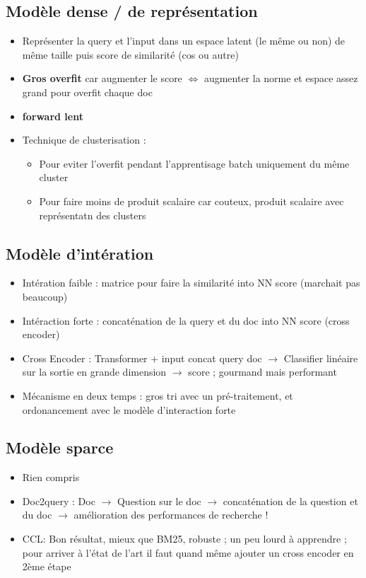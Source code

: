 \documentclass{article}
\theoremstyle{plain}%
\theoremstyle{definition}
\theoremstyle{remark}
\begin{document}
\subsection{Modèle dense / de représentation}
\begin{itemize}
    \item Représenter la query et l'input dans un espace latent (le même ou non) de même taille puis score de similarité (cos ou autre)
    \item \textbf{Gros overfit} car augmenter le score $ \Leftrightarrow $ augmenter la norme et espace assez grand pour overfit chaque doc
    \item \textbf{forward lent}
    \item Technique de clusterisation : \begin{itemize}
        \item Pour eviter l'overfit pendant l'apprentisage batch uniquement du même cluster
        \item Pour faire moins de produit scalaire car couteux, produit scalaire avec représentatn des clusters
    \end{itemize}
\end{itemize}

\subsection{Modèle d'intération}
\begin{itemize}
    \item Intération faible : matrice pour faire la similarité into NN score (marchait pas beaucoup)
    \item Intéraction forte : concaténation de la query et du doc into NN score (cross encoder)
    \item Cross Encoder : Transformer + input concat query doc $\rightarrow$ Classifier linéaire sur la sortie en grande dimension $\rightarrow$ score ; gourmand mais performant 
    \item Mécanisme en deux temps : gros tri avec un pré-traitement, et ordonancement avec le modèle d'interaction forte
\end{itemize}
\subsection{Modèle sparce}
\begin{itemize}
    \item Rien compris
    \item Doc2query : Doc $\rightarrow$ Question sur le doc $\rightarrow$ concaténation de la question et du doc $\rightarrow$ amélioration des performances de recherche !
    \item CCL:  Bon résultat, mieux que BM25, robuste ; un peu lourd à apprendre ; pour arriver à l'état de l'art il faut quand même ajouter un cross encoder en 2ème étape
\end{itemize}
\end{document}
